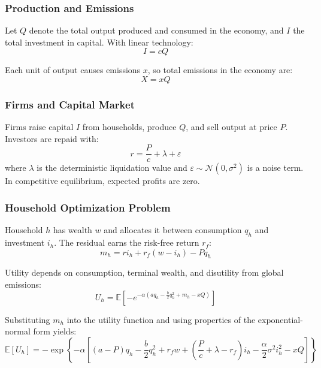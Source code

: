 \documentclass[12pt,a4paper]{article}%
\begin{document}
\subsubsection{Production and Emissions}

Let $Q$ denote the total output produced and consumed in the economy, and $I$ the total investment in capital. With linear technology:
\begin{equation}
I = cQ 
\end{equation}

Each unit of output causes emissions $x$, so total emissions in the economy are:
\begin{equation}
X = xQ 
\end{equation}

\subsubsection{Firms and Capital Market}

Firms raise capital $I$ from households, produce $Q$, and sell output at price $P$. Investors are repaid with:
\begin{equation}
r = \frac{P}{c} + \lambda + \varepsilon 
\end{equation}
where $\lambda$ is the deterministic liquidation value and $\varepsilon \sim \mathcal{N}(0, \sigma^2)$ is a noise term. In competitive equilibrium, expected profits are zero.

\subsubsection{Household Optimization Problem}

Household $h$ has wealth $w$ and allocates it between consumption $q_h$ and investment $i_h$. The residual earns the risk-free return $r_f$:
\begin{equation}
m_h = r i_h + r_f(w - i_h) - P q_h 
\end{equation}

Utility depends on consumption, terminal wealth, and disutility from global emissions:
\begin{equation}
U_h = \mathbb{E} \left[ -e^{-\alpha \left( a q_h - \frac{b}{2}q_h^2 + m_h - xQ \right)} \right] \tag{5}
\end{equation}

Substituting $m_h$ into the utility function and using properties of the exponential-normal form yields:
\begin{equation}
\mathbb{E}[U_h] = -\exp\left\{ -\alpha \left[ (a - P)q_h - \frac{b}{2}q_h^2 + r_f w + \left( \frac{P}{c} + \lambda - r_f \right)i_h - \frac{\alpha}{2}\sigma^2 i_h^2 - xQ \right] \right\} 
\end{equation}
\end{document}
